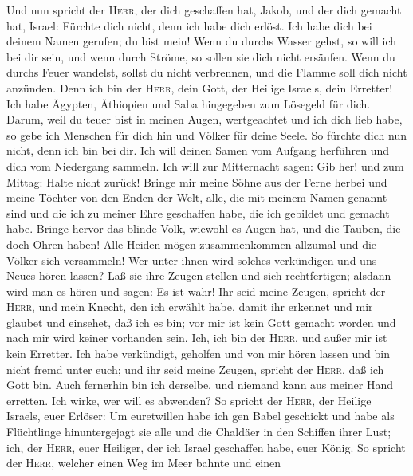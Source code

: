  Und nun spricht der \textsc{Herr}, der dich geschaffen
hat, Jakob, und der dich gemacht hat, Israel: Fürchte dich nicht, denn
ich habe dich erlöst. Ich habe dich bei deinem Namen gerufen; du bist
mein!  Wenn du durchs Wasser gehst, so will ich bei dir
sein, und wenn durch Ströme, so sollen sie dich nicht ersäufen. Wenn du
durchs Feuer wandelst, sollst du nicht verbrennen, und die Flamme soll
dich nicht anzünden.  Denn ich bin der \textsc{Herr}, dein
Gott, der Heilige Israels, dein Erretter! Ich habe Ägypten, Äthiopien
und Saba hingegeben zum Lösegeld für dich.  Darum, weil du
teuer bist in meinen Augen, wertgeachtet und ich dich lieb habe, so gebe
ich Menschen für dich hin und Völker für deine Seele.  So
fürchte dich nun nicht, denn ich bin bei dir. Ich will deinen Samen vom
Aufgang herführen und dich vom Niedergang sammeln.  Ich
will zur Mitternacht sagen: Gib her! und zum Mittag: Halte nicht zurück!
Bringe mir meine Söhne aus der Ferne herbei und meine Töchter von den
Enden der Welt,  alle, die mit meinem Namen genannt sind
und die ich zu meiner Ehre geschaffen habe, die ich gebildet und gemacht
habe.  Bringe hervor das blinde Volk, wiewohl es Augen
hat, und die Tauben, die doch Ohren haben!  Alle Heiden
mögen zusammenkommen allzumal und die Völker sich versammeln! Wer unter
ihnen wird solches verkündigen und uns Neues hören lassen? Laß sie ihre
Zeugen stellen und sich rechtfertigen; alsdann wird man es hören und
sagen: Es ist wahr!  Ihr seid meine Zeugen, spricht der
\textsc{Herr}, und mein Knecht, den ich erwählt habe, damit ihr erkennet
und mir glaubet und einsehet, daß ich es bin; vor mir ist kein Gott
gemacht worden und nach mir wird keiner vorhanden sein. 
Ich, ich bin der \textsc{Herr}, und außer mir ist kein Erretter.
 Ich habe verkündigt, geholfen und von mir hören lassen
und bin nicht fremd unter euch; und ihr seid meine Zeugen, spricht der
\textsc{Herr}, daß ich Gott bin.  Auch fernerhin bin ich
derselbe, und niemand kann aus meiner Hand erretten. Ich wirke, wer will
es abwenden?  So spricht der \textsc{Herr}, der Heilige
Israels, euer Erlöser: Um euretwillen habe ich gen Babel geschickt und
habe als Flüchtlinge hinuntergejagt sie alle und die Chaldäer in den
Schiffen ihrer Lust;  ich, der \textsc{Herr}, euer
Heiliger, der ich Israel geschaffen habe, euer König.  So
spricht der \textsc{Herr}, welcher einen Weg im Meer bahnte und einen
